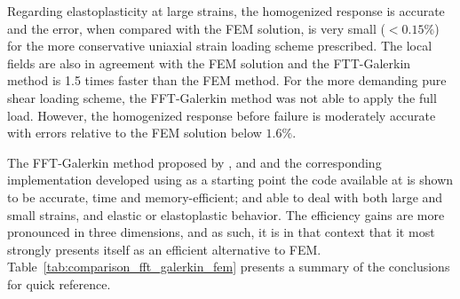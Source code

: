 Regarding elastoplasticity at large strains, the homogenized response is accurate and the error, when compared with the FEM solution, is very small (\(<0.15\%\)) for the more conservative uniaxial strain loading scheme prescribed.
The local fields are also in agreement with the FEM solution and the FTT-Galerkin method is 1.5 times faster than the FEM method.
For the more demanding pure shear loading scheme, the FFT-Galerkin method was not able to apply the full load.
However, the homogenized response before failure is moderately accurate with errors relative to the FEM solution below \(1.6\%\).

The FFT-Galerkin method proposed by \cite{vondrejc_fft-based_2014}, \cite{zeman_finite_2017} and \cite{de_geus_finite_2017} and the corresponding implementation developed using as a starting point the code available at \cite{} is shown to be accurate, time and memory-efficient; and able to deal with both large and small strains, and elastic or elastoplastic behavior.
The efficiency gains are more pronounced in three dimensions, and as such, it is in that context that it most strongly presents itself as an efficient alternative to FEM.
Table~\ref{tab:comparison_fft_galerkin_fem} presents a summary of the conclusions for quick reference.

